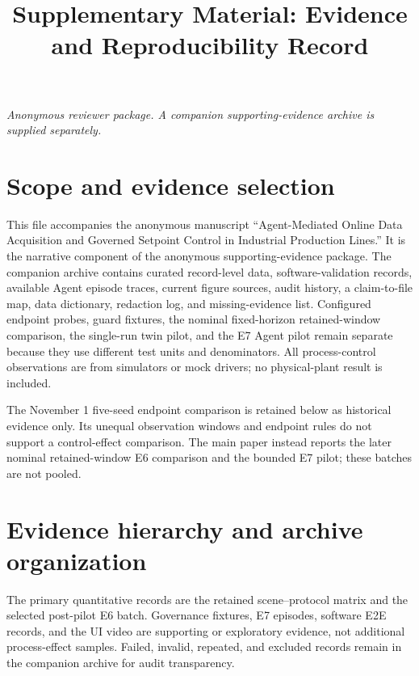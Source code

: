\documentclass[10pt]{article}
\title{Supplementary Material: Evidence and Reproducibility Record}
\author{}
\date{}
\begin{document}
\maketitle
\noindent\textit{Anonymous reviewer package. A companion supporting-evidence archive is supplied separately.}\par\medskip

\section*{Scope and evidence selection}
This file accompanies the anonymous manuscript ``Agent-Mediated Online Data Acquisition and Governed Setpoint Control in Industrial Production Lines.'' It is the narrative component of the anonymous supporting-evidence package. The companion archive contains curated record-level data, software-validation records, available Agent episode traces, current figure sources, audit history, a claim-to-file map, data dictionary, redaction log, and missing-evidence list. Configured endpoint probes, guard fixtures, the nominal fixed-horizon retained-window comparison, the single-run twin pilot, and the E7 Agent pilot remain separate because they use different test units and denominators. All process-control observations are from simulators or mock drivers; no physical-plant result is included.

The November 1 five-seed endpoint comparison is retained below as historical evidence only. Its unequal observation windows and endpoint rules do not support a control-effect comparison. The main paper instead reports the later nominal retained-window E6 comparison and the bounded E7 pilot; these batches are not pooled.

\section*{Evidence hierarchy and archive organization}
The primary quantitative records are the retained scene--protocol matrix and the selected post-pilot E6 batch. Governance fixtures, E7 episodes, software E2E records, and the UI video are supporting or exploratory evidence, not additional process-effect samples. Failed, invalid, repeated, and excluded records remain in the companion archive for audit transparency.
\end{document}
